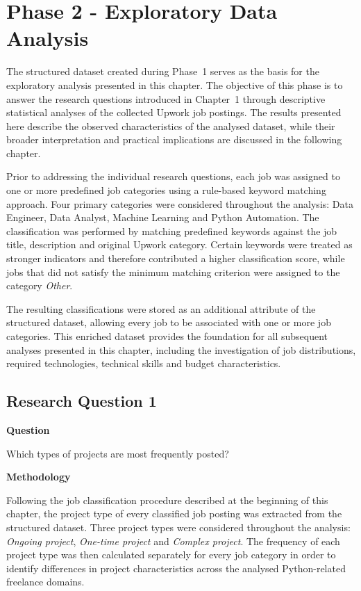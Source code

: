 
\chapter{Phase 2 - Exploratory Data Analysis}

The structured dataset created during Phase~1 serves as the basis for the exploratory analysis presented in this chapter. The objective of 
this phase is to answer the research questions introduced in Chapter~1 through descriptive statistical analyses of the collected Upwork job
postings. The results presented here describe the observed characteristics of the analysed dataset, while their broader interpretation and
practical implications are discussed in the following chapter.

Prior to addressing the individual research questions, each job was assigned to one or more predefined job categories using a rule-based
keyword matching approach. Four primary categories were considered throughout the analysis: Data Engineer, Data Analyst, Machine Learning and
Python Automation. The classification was performed by matching predefined keywords against the job title, description and original Upwork category. 
Certain keywords were treated as stronger indicators and therefore contributed a higher classification score, while jobs that did not satisfy the
minimum matching criterion were assigned to the category \textit{Other}.

The resulting classifications were stored as an additional attribute of the structured dataset, allowing every job to be associated with one or
more job categories. This enriched dataset provides the foundation for all subsequent analyses presented in this chapter, including the investigation of
job distributions, required technologies, technical skills and budget characteristics.

\section{Research Question 1}

\textbf{Question}

Which types of projects are most frequently posted?

\medskip

\textbf{Methodology}

Following the job classification procedure described at the beginning of this chapter, the project type of every classified job posting was extracted from
the structured dataset. Three project types were considered throughout the analysis: \textit{Ongoing project}, \textit{One-time project} and
\textit{Complex project}. The frequency of each project type was then calculated separately for every job category in order to identify differences in
project characteristics across the analysed Python-related freelance domains.

